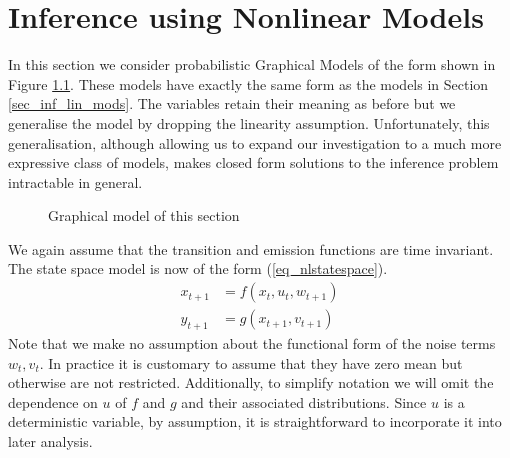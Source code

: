 \chapter{Inference using Nonlinear Models}
\label{sec_inf_nonlin_mods}
In this section we consider probabilistic Graphical Models of the form shown in Figure \ref{fig_nlmod}. These models have exactly the same form as the models in Section \ref{sec_inf_lin_mods}. The variables retain their meaning as before but we generalise the model by dropping the linearity assumption. Unfortunately, this generalisation, although allowing us to expand our investigation to a much more expressive class of models, makes closed form solutions to the inference problem intractable in general.   
\begin{figure}[H] 
\centering
{}
\caption{Graphical model of this section}
\label{fig_nlmod}
\end{figure}
We again assume that the transition and emission functions are time invariant. The state space model is now of the form (\ref{eq_nlstatespace}).
\begin{equation}
\begin{aligned}
x_{t+1} &= f(x_t, u_t, w_{t+1}) \\
y_{t+1} &= g(x_{t+1}, v_{t+1})
\end{aligned}
\label{eq_nlstatespace}
\end{equation}
Note that we make no assumption about the functional form of the noise terms $w_t,v_t$. In practice it is customary to assume that they have zero mean but otherwise are not restricted. Additionally, to simplify notation we will omit the dependence on $u$ of $f$ and $g$ and their associated distributions. Since $u$ is a deterministic variable, by assumption, it is straightforward to incorporate it into later analysis. 

